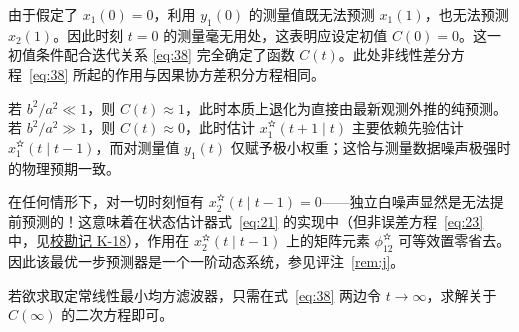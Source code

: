 \begin{example}
由于假定了 $x_1(0) = 0$，利用 $y_1(0)$ 的测量值既无法预测 $x_1(1)$，也无法预测 $x_2(1)$。因此时刻 $t = 0$ 的测量毫无用处，这表明应设定初值 $C(0) = 0$。这一初值条件配合迭代关系 \eqref{eq:38} 完全确定了函数 $C(t)$。此处非线性差分方程~\eqref{eq:38} 所起的作用与因果协方差积分方程相同。

若 $b^2 / a^2 \ll 1$，则 $C(t) \approx 1$，此时本质上退化为直接由最新观测外推的纯预测。若 $b^2 / a^2 \gg 1$，则 $C(t) \approx 0$，此时估计 $x_1^{\text{✫}}(t + 1 \mid t)$ 主要依赖先验估计 $x_1^{\text{✫}}(t \mid t - 1)$，而对测量值 $y_1(t)$ 仅赋予极小权重；这恰与测量数据噪声极强时的物理预期一致。

在任何情形下，对一切时刻恒有 $x_2^{\text{✫}}(t \mid t - 1) = 0$——独立白噪声显然是无法提前预测的！这意味着在状态估计器式~\eqref{eq:21} 的实现中（但非误差方程~\eqref{eq:23} 中，见\hyperref[sec:k18]{校勘记 K-18}），作用在 $x_2^{\text{✫}}(t \mid t - 1)$ 上的矩阵元素 $\phi_{12}^{\text{✫}}$ 可等效置零省去。因此该最优一步预测器是一个一阶动态系统，参见评注~\ref{rem:j}。

若欲求取定常线性最小均方滤波器，只需在式~\eqref{eq:38} 两边令 $t \to \infty$，求解关于 $C(\infty)$ 的二次方程即可。

\end{example}


